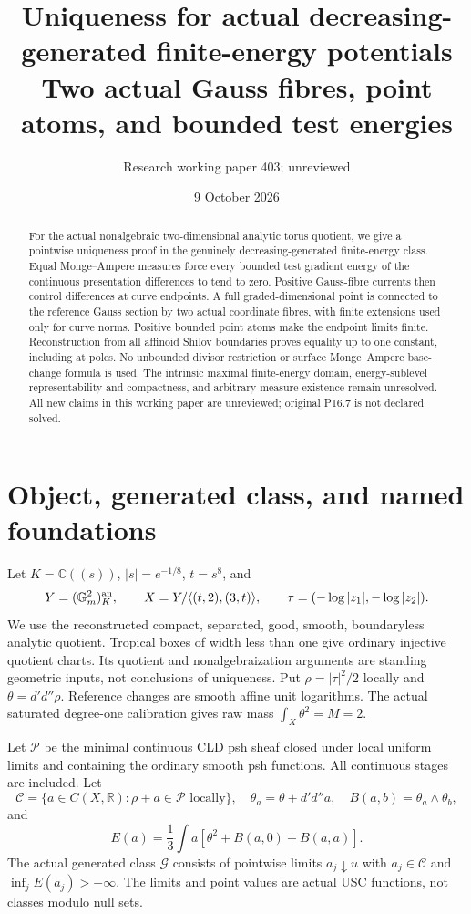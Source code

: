 \documentclass[11pt]{article}
\title{Uniqueness for actual decreasing-generated finite-energy potentials\\
Two actual Gauss fibres, point atoms, and bounded test energies}
\author{Research working paper 403; unreviewed}
\date{9 October 2026}
\newcommand{\DD}{d'd''}
\newcommand{\C}{\mathcal C}
\newcommand{\G}{\mathcal G}
\newcommand{\RR}{\mathbb R}
\theoremstyle{remark}\newtheorem{remark}[theorem]{Remark}
\begin{document}
\maketitle
\begin{abstract}
For the actual nonalgebraic two-dimensional analytic torus quotient,
we give a pointwise uniqueness proof in the genuinely
decreasing-generated finite-energy class. Equal Monge--Ampere
measures force every bounded test gradient energy of the continuous
presentation differences to tend to zero. Positive Gauss-fibre
currents then control differences at curve endpoints. A full
graded-dimensional point is connected to the reference Gauss
section by two actual coordinate fibres, with finite extensions
used only for curve norms. Positive bounded point atoms make the
endpoint limits finite. Reconstruction from all affinoid Shilov
boundaries proves equality up to one constant, including at poles.
No unbounded divisor restriction or surface Monge--Ampere
base-change formula is used. The intrinsic maximal finite-energy
domain, energy-sublevel representability and compactness, and
arbitrary-measure existence remain unresolved. All new claims in
this working paper are unreviewed; original P16.7 is not declared
solved.
\end{abstract}

\section{Object, generated class, and named foundations}
Let $K=\mathbb C((s))$, $|s|=e^{-1/8}$, $t=s^8$, and
\[
Y=(\mathbb G_m^2)^{\rm an}_K,\qquad
X=Y/\langle(t,2),(3,t)\rangle,\qquad
\tau=(-\log|z_1|,-\log|z_2|).
\]
We use the reconstructed compact, separated, good, smooth,
boundaryless analytic quotient. Tropical boxes of width less than
one give ordinary injective quotient charts. Its quotient and
nonalgebraization arguments are standing geometric inputs, not
conclusions of uniqueness. Put $\rho=|\tau|^2/2$ locally and
$\theta=\DD\rho$. Reference changes are smooth affine unit
logarithms. The actual saturated degree-one calibration gives raw
mass $\int_X\theta^2=M=2$.

Let $\mathscr P$ be the minimal continuous CLD psh sheaf closed under
local uniform limits and containing the ordinary smooth psh
functions. All continuous stages are included. Let
\[
\C=\{a\in C(X,\RR):\rho+a\in\mathscr P\text{ locally}\},\quad
\theta_a=\theta+\DD a,\quad B(a,b)=\theta_a\wedge\theta_b,
\]
and
\[
E(a)=\frac13\int a[\theta^2+B(a,0)+B(a,a)].
\]
The actual generated class $\G$ consists of pointwise limits
$a_j\downarrow u$ with $a_j\in\C$ and $\inf_jE(a_j)>-\infty$.
The limits and point values are actual USC functions, not classes
modulo null sets.
\end{document}
